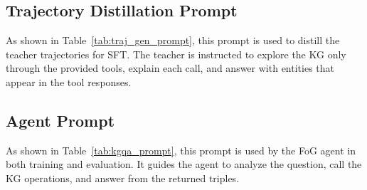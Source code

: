 \subsection{Trajectory Distillation Prompt}
\label{app:prompts_traj}
As shown in Table~\ref{tab:traj_gen_prompt}, this prompt is used to distill the teacher trajectories for SFT. The teacher is instructed to explore the KG only through the provided tools, explain each call, and answer with entities that appear in the tool responses.

\subsection{Agent Prompt}
\label{app:prompts_train}
As shown in Table~\ref{tab:kgqa_prompt}, this prompt is used by the FoG agent in both training and evaluation. It guides the agent to analyze the question, call the KG operations, and answer from the returned triples.





